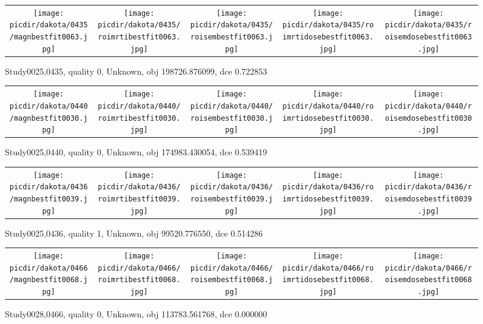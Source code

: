 \documentclass{article}
\newcommand{\picdir}{pdffig}
\begin{document}
\begin{figure} \begin{tabular}{ccccc} \scalebox{0.21}{\texttt{[image: \\picdir/dakota/0435/magnbestfit0063.jpg]}} & \scalebox{0.21}{\texttt{[image: \\picdir/dakota/0435/roimrtibestfit0063.jpg]}} & \scalebox{0.21}{\texttt{[image: \\picdir/dakota/0435/roisembestfit0063.jpg]}}  & \scalebox{0.21}{\texttt{[image: \\picdir/dakota/0435/roimrtidosebestfit0063.jpg]}} & \scalebox{0.21}{\texttt{[image: \\picdir/dakota/0435/roisemdosebestfit0063.jpg]}} \end{tabular} \caption{Study0025,0435, quality 0, Unknown, obj 198726.876099, dce 0.722853  } \label{Study00250435} \end{figure}
\begin{figure} \begin{tabular}{ccccc} \scalebox{0.21}{\texttt{[image: \\picdir/dakota/0440/magnbestfit0030.jpg]}} & \scalebox{0.21}{\texttt{[image: \\picdir/dakota/0440/roimrtibestfit0030.jpg]}} & \scalebox{0.21}{\texttt{[image: \\picdir/dakota/0440/roisembestfit0030.jpg]}}  & \scalebox{0.21}{\texttt{[image: \\picdir/dakota/0440/roimrtidosebestfit0030.jpg]}} & \scalebox{0.21}{\texttt{[image: \\picdir/dakota/0440/roisemdosebestfit0030.jpg]}} \end{tabular} \caption{Study0025,0440, quality 0, Unknown, obj 174983.430054, dce 0.539419  } \label{Study00250440} \end{figure}
\begin{figure} \begin{tabular}{ccccc} \scalebox{0.21}{\texttt{[image: \\picdir/dakota/0436/magnbestfit0039.jpg]}} & \scalebox{0.21}{\texttt{[image: \\picdir/dakota/0436/roimrtibestfit0039.jpg]}} & \scalebox{0.21}{\texttt{[image: \\picdir/dakota/0436/roisembestfit0039.jpg]}}  & \scalebox{0.21}{\texttt{[image: \\picdir/dakota/0436/roimrtidosebestfit0039.jpg]}} & \scalebox{0.21}{\texttt{[image: \\picdir/dakota/0436/roisemdosebestfit0039.jpg]}} \end{tabular} \caption{Study0025,0436, quality 1, Unknown, obj 99520.776550, dce 0.514286  } \label{Study00250436} \end{figure}
\begin{figure} \begin{tabular}{ccccc} \scalebox{0.21}{\texttt{[image: \\picdir/dakota/0466/magnbestfit0068.jpg]}} & \scalebox{0.21}{\texttt{[image: \\picdir/dakota/0466/roimrtibestfit0068.jpg]}} & \scalebox{0.21}{\texttt{[image: \\picdir/dakota/0466/roisembestfit0068.jpg]}}  & \scalebox{0.21}{\texttt{[image: \\picdir/dakota/0466/roimrtidosebestfit0068.jpg]}} & \scalebox{0.21}{\texttt{[image: \\picdir/dakota/0466/roisemdosebestfit0068.jpg]}} \end{tabular} \caption{Study0028,0466, quality 0, Unknown, obj 113783.561768, dce 0.000000  } \label{Study00280466} \end{figure}
\end{document}
